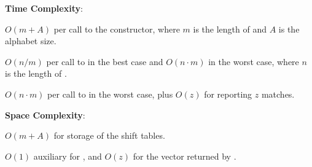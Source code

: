 \textbf{Time Complexity}:
\begin{compactitem}
  \item $O(m + A)$ per call to the constructor, where $m$ is the length of  and $A$ is the alphabet size.
  \item $O(n/m)$ per call to  in the best case and $O(n \cdot m)$ in the worst case, where $n$ is the length of .
  \item $O(n \cdot m)$ per call to  in the worst case, plus $O(z)$ for reporting $z$ matches.
\end{compactitem}

\textbf{Space Complexity}:
\begin{compactitem}
  \item $O(m + A)$ for storage of the shift tables.
  \item $O(1)$ auxiliary for , and $O(z)$ for the vector returned by .
\end{compactitem}

